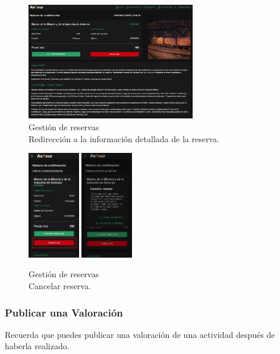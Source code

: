 \begin{figure}[H]
\begin{minipage}{0.5\textwidth}
		\includegraphics[width=0.65\textwidth]{7-Construccion/Manuales/web/reserva detalles.png}
		\caption{Gestión de reservas \\ Redirección a la información detallada de la reserva.}
		\label{fig:detalles-reserva}
	\end{minipage}
\end{figure}

\begin{figure}[H]
	\centering
	\includegraphics[width=0.2\textwidth]{7-Construccion/Manuales/mobile/cancelar reserva.png}
	\includegraphics[width=0.2\textwidth]{7-Construccion/Manuales/mobile/confirmar cancelacion reserva.png}
	\caption{Gestión de reservas \\ Cancelar reserva.}
	\label{fig:cancelar-reserva}
\end{figure}

\subsubsection{Publicar una Valoración}
Recuerda que puedes publicar una valoración de una actividad después de haberla realizado.

